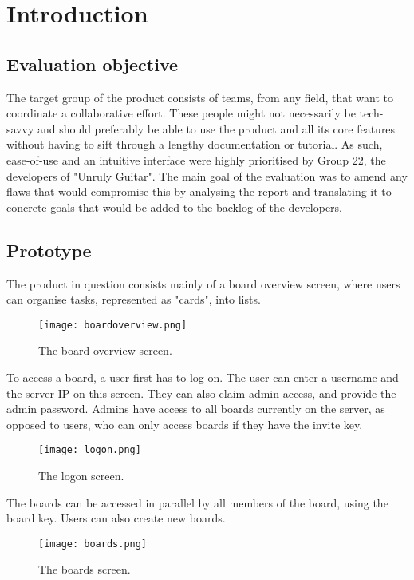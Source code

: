 \section{Introduction}

\subsection{Evaluation objective}
The target group of the product consists of teams, from any field, that want to coordinate a collaborative effort. These people might not necessarily be tech-savvy and should preferably be able to use the product and all its core features without having to sift through a lengthy documentation or tutorial. As such, ease-of-use and an intuitive interface were highly prioritised by Group 22, the developers of "Unruly Guitar". The main goal of the evaluation was to amend any flaws that would compromise this by analysing the report and translating it to concrete goals that would be added to the backlog of the developers. 

\subsection{Prototype}

The product in question consists mainly of a board overview screen, where users can organise tasks, represented as "cards", into lists.

\begin{figure}[ht]
\texttt{[image: boardoverview.png]}
\caption{The board overview screen.}
\end{figure}

To access a board, a user first has to log on. The user can enter a username and the server IP on this screen. They can also claim admin access, and provide the admin password. Admins have access to all boards currently on the server, as opposed to users, who can only access boards if they have the invite key.

\begin{figure}[ht]
    \texttt{[image: logon.png]}
    \caption{The logon screen.}
\end{figure}
 
 The boards can be accessed in parallel by all members of the board, using the board key. Users can also create new boards.

\begin{figure}[ht]
    \texttt{[image: boards.png]}
    \caption{The boards screen.}
\end{figure}

